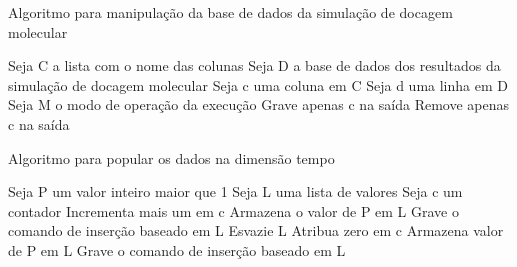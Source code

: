 \begin{algorithm}[H]
\caption{Algoritmo para manipulação da base de dados da simulação de docagem molecular}
\label{alg:ajustaColunaDocking}
{\fontsize{10}{10}\selectfont
\begin{algorithmic}[1]
	\STATE Seja C a lista com o nome das colunas
	\STATE Seja D a base de dados dos resultados da simulação de docagem molecular
	\STATE Seja c uma coluna em C
	\STATE Seja d uma linha em D
	\STATE Seja M o modo de operação da execução
			\STATE Grave apenas c na saída
			\ENDFOR
		\ENDFOR
	\ENDIF
			\STATE Remove apenas c na saída
			\ENDFOR
		\ENDFOR
	\ENDIF
\end{algorithmic}
}
\end{algorithm}

\begin{algorithm}[H]
\caption{Algoritmo para popular os dados na dimensão tempo}
\label{alg:criaDadosDIMTempo}
{\fontsize{10}{10}\selectfont
\begin{algorithmic}[1]
	\STATE Seja P um valor inteiro maior que 1
	\STATE Seja L uma lista de valores
	\STATE Seja c um contador
		\STATE Incrementa mais um em c
			\STATE Armazena o valor de P em L
			\STATE Grave o comando de inserção baseado em L
			\STATE Esvazie L
			\STATE Atribua zero em c
		\ELSE
			\STATE Armazena valor de P em L
		\ENDIF
	\ENDFOR
		\STATE Grave o comando de inserção baseado em L
	\ENDIF
\end{algorithmic}
}
\end{algorithm}

